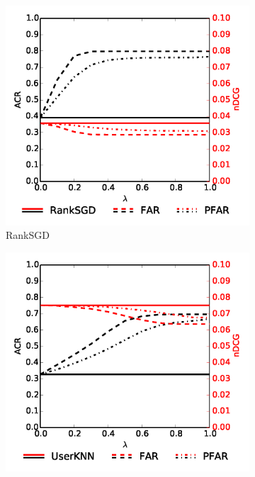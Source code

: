 \begin{figure}
	\centering
	\begin{subfigure}{0.49\columnwidth} %
		\includegraphics[width=\textwidth]{imgs/far/ranksgd.png}
		\caption{RankSGD \cite{pmlr-v18-jahrer12b}} %
	\end{subfigure}
	\begin{subfigure}{0.49\columnwidth} %
		\includegraphics[width=\textwidth]{imgs/far/userknn.png}

\end{subfigure}
\end{figure}
